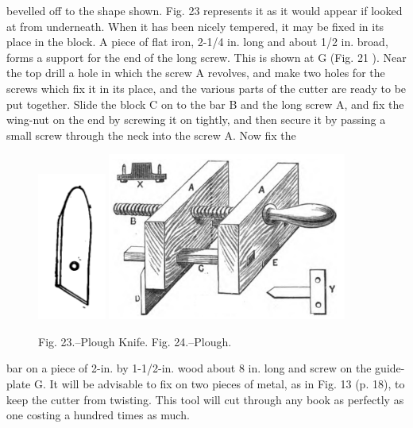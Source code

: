 \documentclass[twoside]{book}
\begin{document}
bevelled off to the shape shown. Fig. 23 represents
it as it would appear if looked at from underneath.
\pagebreak
When it has been nicely tempered, it may be fixed
in its place in the block. A piece of flat iron, 2-1/4 in.
long and about 1/2 in. broad, forms a support for
the end of the long screw. This is shown at G
(Fig. 21 ). Near the top drill a hole in which the
screw A revolves, and make two holes for the screws
which fix it in its place, and the various parts of
the cutter are ready to be put together. Slide the
block C on to the bar B and the long screw A, and
fix the wing-nut on the end by screwing it on
tightly, and then secure it by passing a small screw
through the neck into the screw A. Now fix the
	\begin{figure}[h]
		\centering
		\includegraphics[width=0.2\textwidth]{Figures/_023.png}
		\includegraphics[width=0.7\textwidth]{Figures/_024.png}
		\caption*{Fig. 23.--Plough Knife.  Fig. 24.--Plough.}
	\end{figure}
bar on a piece of 2-in. by 1-1/2-in. wood about 8 in.
long and screw on the guide-plate G. It will be
advisable to fix on two pieces of metal, as in Fig.
13 (p. 18), to keep the cutter from twisting. This
tool will cut through any book as perfectly as one
costing a hundred times as much.
\end{document}
